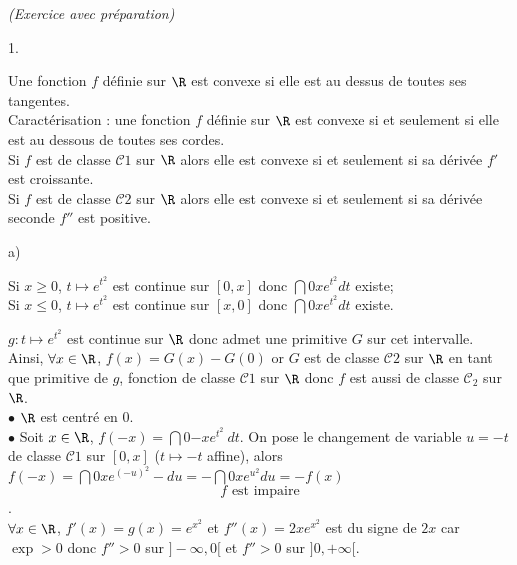 \documentclass[11pt]{article}%
\begin{document}
 \begin{exercice}{\it (Exercice avec préparation)}~
 \begin{noliste}{1.}
 \setlength{\itemsep}{4mm}
 \item Une fonction $f$ définie sur $\R$ est convexe si elle est au
 dessus de toutes ses tangentes.\\
 Caractérisation : une fonction $f$ définie sur $\R$ est convexe si et
seulement si elle est au dessous de toutes ses cordes.\\
 Si $f$ est de classe $\mathcal{C}{1}$ sur $\R$ alors elle est convexe
si et seulement si sa dérivée $f'$ est croissante.\\
 Si $f$ est de classe $\mathcal{C}{2}$ sur $\R$ alors elle est convexe
si et seulement si sa dérivée seconde $f''$ est positive.\\
 \item \begin{noliste}{a)}
 \setlength{\itemsep}{2mm}
 \item Si $x \geq 0$, $t \mapsto e^{t^{2}}$ est continue sur $[0,x]$
donc $\dint{0}{x} e^{t^{2}}dt$ existe; \\
 Si $x \leq 0$, $t \mapsto e^{t^{2}}$ est continue sur $[x,0]$ donc
$\dint{0}{x} e^{t^{2}}dt$ existe.
\item $g : t \mapsto e^{t^{2}}$ est continue sur $\R$ donc admet une
  primitive $G$ sur cet intervalle. Ainsi, $\forall x \in \R$, $f(x) =
  G(x)-G(0)$ or $G$ est de classe $\mathcal{C}{2}$ sur $\R$ en tant
  que primitive de $g$, fonction de classe $\mathcal{C}{1}$ sur $\R$
  donc $f$
  est aussi de classe $\mathcal{C}_{2}$ sur $\R$. \\
  $\bullet$ $\R$ est centré en 0.\\
  $\bullet$ Soit $x \in \R$, $f(-x) = \dint{0}{-x} e^{t^{2}} \ dt$. On
  pose le changement de variable $u = -t$ de classe $\mathcal{C}{1}$
  sur $[0,x]$ ($t \mapsto -t$ affine), alors $f(-x) = \dint{0}{x}
  e^{(-u)^{2}} -du = -\dint{0}{x} e^{u^{2}} du = -f(x)$ \\
 
\[
 \boxed{\text{$f$ est impaire}}
\].\\
 $\forall x \in \R$, $f'(x) = g(x) = e^{x^{2}}$ et $f''(x) = 2x
e^{x^{2}}$ est du signe de $2x$ car $\exp>0$ donc $f'' >0$ sur
$]-\infty, 0[$ et $f''>0$ sur $]0, + \infty[$. \\
 

\end{noliste}
\end{noliste}
\end{exercice}
\end{document}
